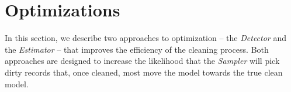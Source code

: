 \section{Optimizations}


In this section, we describe two approaches to optimization 
 -- the {\it Detector} and the {\it Estimator} -- that
improves the efficiency of the cleaning process.  
Both approaches are designed to increase the likelihood that the 
{\it Sampler} will pick dirty records that, once cleaned,
most move the model towards the true clean model.



